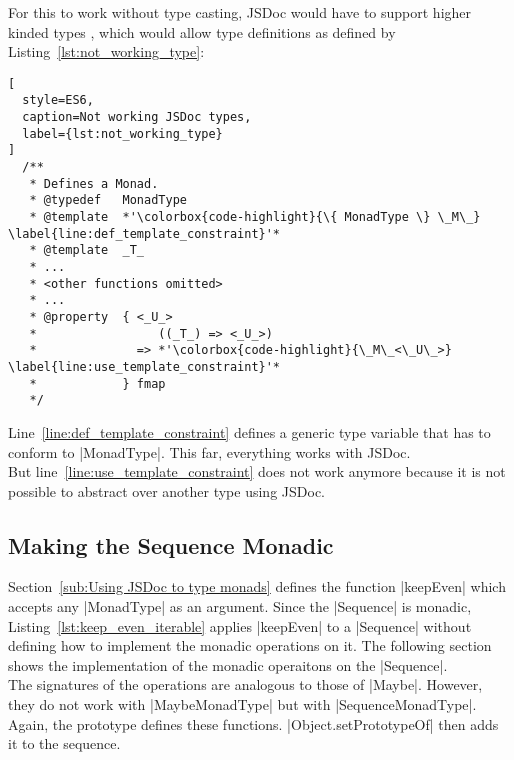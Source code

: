 For this to work without type casting, JSDoc would have to support higher
kinded types \cite{baeldung_higher-kinded_2020}, which would allow type definitions as defined by
Listing~\ref{lst:not_working_type}:

\begin{lstlisting}[
  style=ES6,
  caption=Not working JSDoc types,
  label={lst:not_working_type}
]
  /**
   * Defines a Monad.
   * @typedef   MonadType
   * @template  *'\colorbox{code-highlight}{\{ MonadType \} \_M\_} \label{line:def_template_constraint}'*
   * @template  _T_
   * ...
   * <other functions omitted>
   * ...
   * @property  { <_U_>
   *                 ((_T_) => <_U_>)
   *              => *'\colorbox{code-highlight}{\_M\_<\_U\_>} \label{line:use_template_constraint}'*
   *            } fmap
   */
\end{lstlisting}

Line~\ref{line:def_template_constraint} defines a generic type variable that
has to conform to |MonadType|. This far, everything works with JSDoc.\\ But
line~\ref{line:use_template_constraint} does not work anymore because it is not
possible to abstract over another type using JSDoc.\\

\subsection{Making the Sequence Monadic} %
\label{sub:Making the Sequence Monadic}
Section~\ref{sub:Using JSDoc to type monads} defines the function |keepEven|
which accepts any |MonadType| as an argument. Since the |Sequence| is monadic,
Listing~\ref{lst:keep_even_iterable} applies |keepEven| to a |Sequence| without
defining how to implement the monadic operations on it. The following section
shows the implementation of the monadic operaitons on the |Sequence|.\\
The signatures of the operations are analogous to those of |Maybe|. However,
they do not work with |MaybeMonadType| but with |SequenceMonadType|. Again, the
prototype defines these functions. |Object.setPrototypeOf| then adds it to the
sequence.

